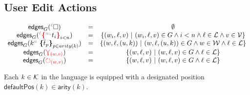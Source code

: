 \subsection{User Edit Actions}

\figureUserActionSyntax


\label{def:edges}
    \[
    \begin{array}{ccc}
    \mathsf{edges}_G(\ehole) & = & \emptyset\\
    \mathsf{edges}_G(\conflict{\termMV}) & = & \SetOf{(w_i,\ell,v)\SuchThat{(w_i,\ell,v)\in G\land i<n\land \ell\in\L\land v\in\V}}\\
    \mathsf{edges}_G(\genericTerm{u}{\subtermMV_p}) & = & \SetOf{(w,\ell,(u,k))\SuchThat{(w,\ell,(u,k))\in G\land w\in\W\land \ell\in\L}}\\
    \mathsf{edges}_G(\multiref) & = & \SetOf{(w,\ell,v)\SuchThat{(w,\ell,v)\in G\land\ell\in\L}}\\
    \mathsf{edges}_G(\uniref) & = & \SetOf{(w,\ell,v)\SuchThat{(w,\ell,v)\in G\land\ell\in\L}}\\
    \end{array}
\]


Each $k\in\mathcal{K}$ in the language is equipped with a designated position $\mathsf{defaultPos}(k)\in \mathsf{arity}(k)$. 

\figureUserActionTransitionsContent

